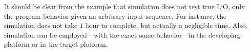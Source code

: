 It should be clear from the example that simulation does not test true I/O, 
only the program behavior given an arbitrary input sequence.
For instance, the simulation does not take $1$ hour to complete, but actually a 
negligible time.
Also, simulation can be employed---with the exact same behavior---in the 
developing platform or in the target platform.

